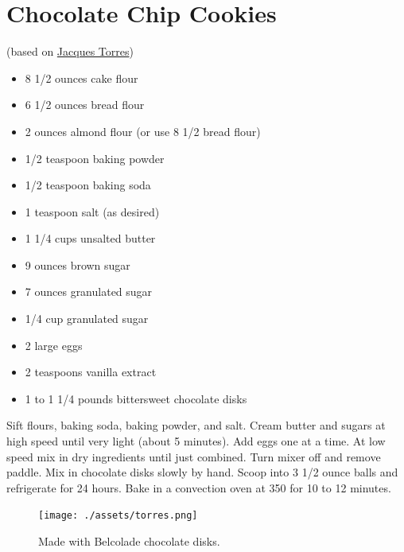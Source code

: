 \documentclass[
  letterpaper,
  DIV=11,
  numbers=noendperiod]{scrreprt}
\providecommand{\tightlist}{%
  \setlength{\itemsep}{0pt}\setlength{\parskip}{0pt}}\usepackage{longtable,booktabs,array}
\begin{document}
\hypertarget{chocolate-chip-cookies}{%
\section*{Chocolate Chip Cookies}\label{chocolate-chip-cookies}}


(based on
\href{https://cooking.nytimes.com/recipes/1015819-chocolate-chip-cookies}{Jacques
Torres})

\begin{itemize}
\tightlist
\item
  8 1/2 ounces cake flour
\item
  6 1/2 ounces bread flour
\item
  2 ounces almond flour (or use 8 1/2 bread flour)
\item
  1/2 teaspoon baking powder
\item
  1/2 teaspoon baking soda
\item
  1 teaspoon salt (as desired)
\item
  1 1/4 cups unsalted butter
\item
  9 ounces brown sugar
\item
  7 ounces granulated sugar
\item
  1/4 cup granulated sugar
\item
  2 large eggs
\item
  2 teaspoons vanilla extract
\item
  1 to 1 1/4 pounds bittersweet chocolate disks
\end{itemize}

Sift flours, baking soda, baking powder, and salt. Cream butter and
sugars at high speed until very light (about 5 minutes). Add eggs one at
a time. At low speed mix in dry ingredients until just combined. Turn
mixer off and remove paddle. Mix in chocolate disks slowly by hand.
Scoop into 3 1/2 ounce balls and refrigerate for 24 hours. Bake in a
convection oven at 350 for 10 to 12 minutes.

\begin{figure}

{\centering \texttt{[image: ./assets/torres.png]}

}

\caption{Made with Belcolade chocolate disks.}

\end{figure}

\end{document}
